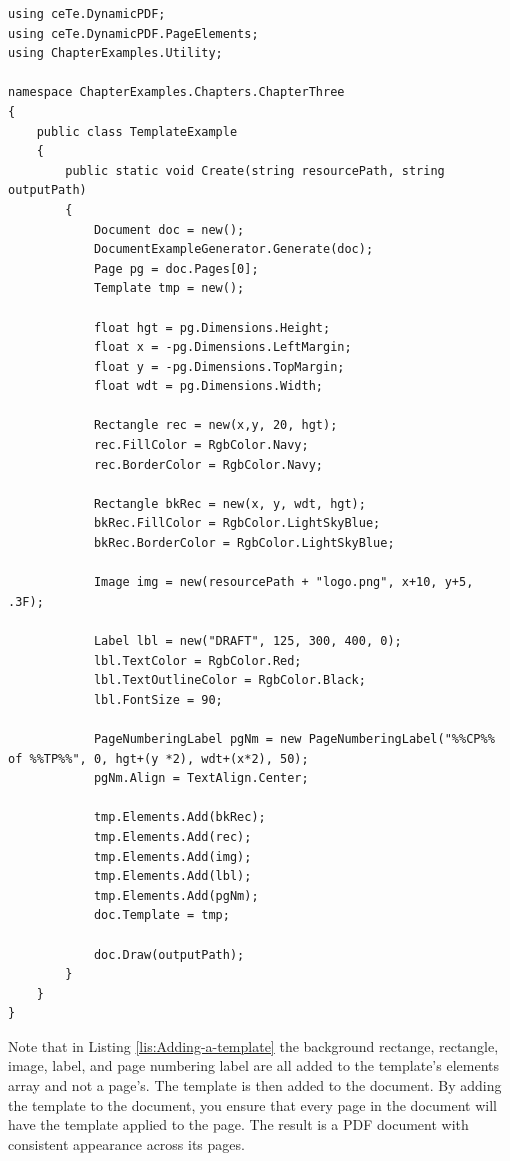 \documentclass[american]{tufte-book}
\numberwithin{equation}{section}
\numberwithin{figure}{section}
\begin{document}
\bgroup{}
\begin{lstlisting}[caption={Adding a template to a PDF document.},label={lis:Adding-a-template},basicstyle={\footnotesize\ttfamily},breaklines=true]
using ceTe.DynamicPDF;
using ceTe.DynamicPDF.PageElements;
using ChapterExamples.Utility;

namespace ChapterExamples.Chapters.ChapterThree
{
    public class TemplateExample
    {
        public static void Create(string resourcePath, string outputPath)
        {
            Document doc = new();
            DocumentExampleGenerator.Generate(doc);
            Page pg = doc.Pages[0];
            Template tmp = new();

            float hgt = pg.Dimensions.Height;
            float x = -pg.Dimensions.LeftMargin;
            float y = -pg.Dimensions.TopMargin;
            float wdt = pg.Dimensions.Width;

            Rectangle rec = new(x,y, 20, hgt);
            rec.FillColor = RgbColor.Navy;
            rec.BorderColor = RgbColor.Navy;

            Rectangle bkRec = new(x, y, wdt, hgt);
            bkRec.FillColor = RgbColor.LightSkyBlue;
            bkRec.BorderColor = RgbColor.LightSkyBlue;

            Image img = new(resourcePath + "logo.png", x+10, y+5, .3F);

            Label lbl = new("DRAFT", 125, 300, 400, 0);
            lbl.TextColor = RgbColor.Red;
            lbl.TextOutlineColor = RgbColor.Black;
            lbl.FontSize = 90;

            PageNumberingLabel pgNm = new PageNumberingLabel("%%CP%% of %%TP%%", 0, hgt+(y *2), wdt+(x*2), 50);
            pgNm.Align = TextAlign.Center;

            tmp.Elements.Add(bkRec);
            tmp.Elements.Add(rec);
            tmp.Elements.Add(img);
            tmp.Elements.Add(lbl);
            tmp.Elements.Add(pgNm);
            doc.Template = tmp;
            
            doc.Draw(outputPath);
        }
    }
}
\end{lstlisting}
\leavevmode\egroup
Note that in Listing \ref{lis:Adding-a-template} the background rectange, rectangle, image, label, and page numbering label are all added to the template's elements array and not a page's. The template is then added to the document. By adding the template to the document, you ensure that every page in the document will have the template applied to the page. The result is a PDF document with consistent appearance across its pages.
\end{document}
